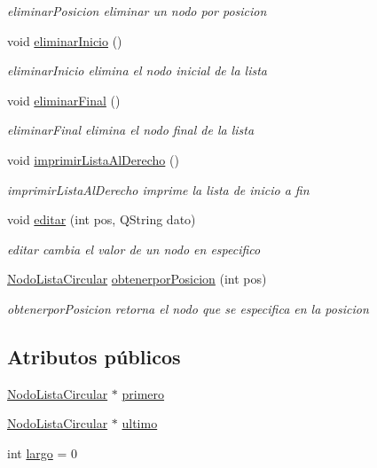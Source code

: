 \begin{DoxyCompactItemize}
\begin{DoxyCompactList}\small\item\em eliminar\+Posicion eliminar un nodo por posicion \end{DoxyCompactList}\item 
void \mbox{\hyperlink{class_circular_list_a3a3c9755cb691e9b02f6d584f2fd1c8e}{eliminar\+Inicio}} ()
\begin{DoxyCompactList}\small\item\em eliminar\+Inicio elimina el nodo inicial de la lista \end{DoxyCompactList}\item 
void \mbox{\hyperlink{class_circular_list_a65808e0225fce3f7b90a70973adfc0ff}{eliminar\+Final}} ()
\begin{DoxyCompactList}\small\item\em eliminar\+Final elimina el nodo final de la lista \end{DoxyCompactList}\item 
void \mbox{\hyperlink{class_circular_list_a731a6238e742307bcd2734ba90ec360f}{imprimir\+Lista\+Al\+Derecho}} ()
\begin{DoxyCompactList}\small\item\em imprimir\+Lista\+Al\+Derecho imprime la lista de inicio a fin \end{DoxyCompactList}\item 
void \mbox{\hyperlink{class_circular_list_a5f98eb44e45979a6373ad7abda059d44}{editar}} (int pos, Q\+String dato)
\begin{DoxyCompactList}\small\item\em editar cambia el valor de un nodo en especifico \end{DoxyCompactList}\item 
\mbox{\hyperlink{class_nodo_lista_circular}{Nodo\+Lista\+Circular}} \mbox{\hyperlink{class_circular_list_abc60af99960852c2aecfc352dd55f48e}{obtenerpor\+Posicion}} (int pos)
\begin{DoxyCompactList}\small\item\em obtenerpor\+Posicion retorna el nodo que se especifica en la posicion \end{DoxyCompactList}\end{DoxyCompactItemize}
\subsection*{Atributos públicos}
\begin{DoxyCompactItemize}
\item 
\mbox{\hyperlink{class_nodo_lista_circular}{Nodo\+Lista\+Circular}} $\ast$ \mbox{\hyperlink{class_circular_list_aed38c338f4196ea0eb66f3990b7f3bc8}{primero}}
\item 
\mbox{\hyperlink{class_nodo_lista_circular}{Nodo\+Lista\+Circular}} $\ast$ \mbox{\hyperlink{class_circular_list_a45e599ae210b5ebc41a5cd9149bce79e}{ultimo}}
\item 
int \mbox{\hyperlink{class_circular_list_ab94765d81b2b6bd145abdb7dad48339e}{largo}} = 0
\end{DoxyCompactItemize}


